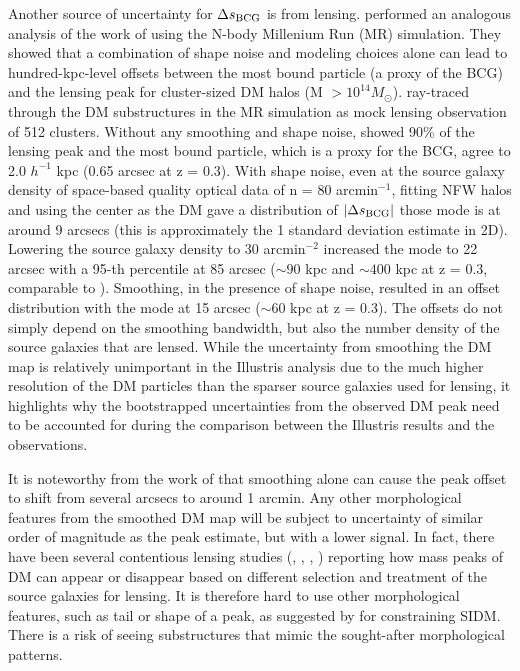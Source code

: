Another source of uncertainty for $\Delta s_{\rm BCG}$ is from lensing. 
\cite{Dietrich2012} performed an analogous analysis of the work of \cite{Oguri2010} 
using the N-body Millenium Run (MR) simulation.
They showed that a combination of shape noise and modeling choices 
alone can lead to hundred-kpc-level offsets between the most bound particle 
(a proxy of the BCG) and the lensing peak for cluster-sized DM halos 
(M $> 10^{14 }M_\odot$).  
\cite{Dietrich2012} ray-traced through the DM substructures in the MR simulation 
as mock lensing observation of 512 clusters.  
Without any smoothing and shape noise, \cite{Dietrich2012} showed 
90\% of the lensing peak and the 
most bound particle, which is a proxy for the BCG, agree to 2.0 $h^{-1}$ kpc
(0.65 arcsec at z = 0.3). 
With shape noise,
even at the source galaxy density of space-based quality optical data of n = 80
arcmin$^{-1}$, fitting NFW halos and using the center as the DM gave a 
distribution of $|\Delta s_{\rm BCG}|$ those mode is at around 9 arcsecs (this is
approximately the 1 standard deviation estimate in 2D). 
Lowering the source galaxy density to 30 arcmin$^{-2}$ increased the mode
to 22 arcsec with a 95-th percentile at 85 arcsec 
($\sim 90$ kpc and $\sim 400$ kpc at z = 0.3, comparable to \citealt{Oguri2010}). 
Smoothing, in the presence of shape noise,
resulted in an offset distribution with the mode at
15 arcsec ($\sim 60$ kpc at z = 0.3). 
The offsets do not simply depend on the smoothing bandwidth, 
but also the number density of the source galaxies that are lensed. 
While the uncertainty from smoothing the DM map is
relatively unimportant in the Illustris analysis due to the much higher resolution 
of the DM particles than the sparser source galaxies used for lensing, it
highlights why the bootstrapped uncertainties from the observed
DM peak need to be accounted for during the comparison between the
Illustris results and the observations.

It is noteworthy from the work of \cite{Dietrich2012} that 
smoothing alone can cause the peak offset to shift from several arcsecs to
around 1 arcmin.
Any other morphological features from the smoothed DM map will be subject 
to uncertainty of similar order of magnitude as the peak
estimate, but with a lower signal. 
In fact, there have been several contentious lensing studies (\citealt{Clowe2012},
\citealt{Jee2014b}, \citealt{Wittman2014}, \citealt{Cook2012})
reporting how mass peaks of DM can appear or disappear based on
different selection and treatment of the source galaxies for lensing. 
It is therefore hard to use other morphological features, such as tail or shape 
of a peak,
as suggested by \cite{Kahlhoefer14} for constraining SIDM.
There is a risk of seeing substructures that mimic the sought-after 
morphological patterns. 

